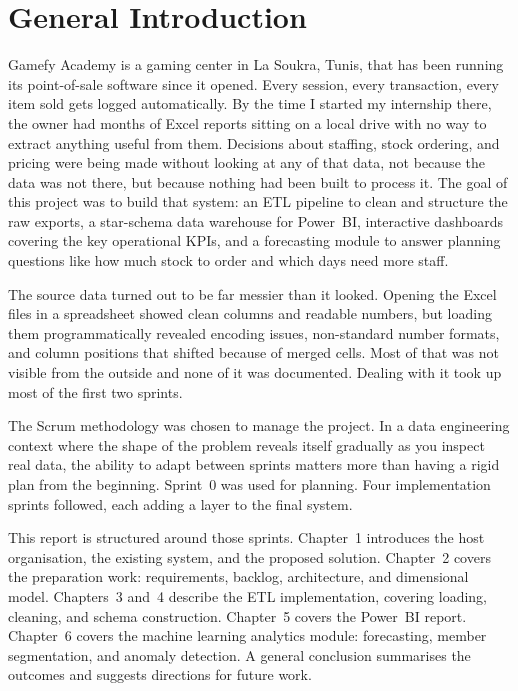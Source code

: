 \documentclass[12pt, a4paper]{report}
\begin{document}
\newpage

\chapter*{General Introduction}

Gamefy Academy is a gaming center in La Soukra, Tunis, that has been running its
point-of-sale software since it opened. Every session, every transaction, every item
sold gets logged automatically. By the time I started my internship there, the owner
had months of Excel reports sitting on a local drive with no way to extract anything
useful from them. Decisions about staffing, stock ordering, and pricing were being
made without looking at any of that data, not because the data was not there, but
because nothing had been built to process it. The goal of this project was to build
that system: an ETL pipeline to clean and structure the raw exports, a star-schema
data warehouse for Power~BI, interactive dashboards covering the key operational
KPIs, and a forecasting module to answer planning questions like how much stock to
order and which days need more staff.

The source data turned out to be far messier than it looked. Opening the Excel files
in a spreadsheet showed clean columns and readable numbers, but loading them
programmatically revealed encoding issues, non-standard number formats, and column
positions that shifted because of merged cells. Most of that was not visible from
the outside and none of it was documented. Dealing with it took up most of the
first two sprints.

The Scrum methodology was chosen to manage the project. In a data engineering
context where the shape of the problem reveals itself gradually as you inspect real
data, the ability to adapt between sprints matters more than having a rigid plan
from the beginning. Sprint~0 was used for planning. Four implementation sprints
followed, each adding a layer to the final system.

This report is structured around those sprints. Chapter~1 introduces the host
organisation, the existing system, and the proposed solution. Chapter~2 covers the
preparation work: requirements, backlog, architecture, and dimensional model.
Chapters~3 and~4 describe the ETL implementation, covering loading, cleaning, and schema
construction. Chapter~5 covers the Power~BI report. Chapter~6 covers the machine learning analytics module: forecasting, member
segmentation, and anomaly detection. A general conclusion summarises the outcomes
and suggests directions for future work.
\end{document}
